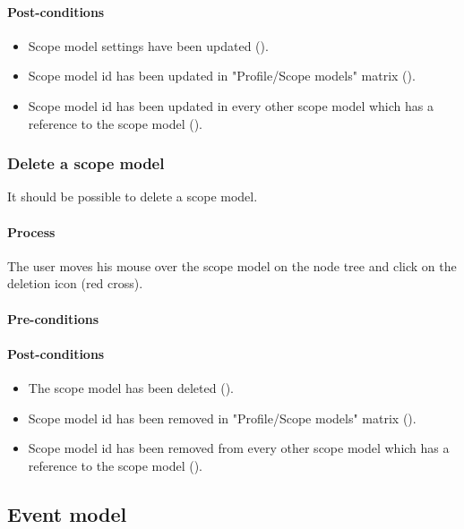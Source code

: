 \documentclass[11pt,a4paper,oneside]{article}
\begin{document}
\paragraph{Post-conditions}
\begin{itemize}
	\item Scope model settings have been updated ().
	\item Scope model id has been updated in "Profile/Scope models" matrix ().
	\item Scope model id has been updated in every other scope model which has a reference to the scope model ().
\end{itemize}

\subsubsection{Delete a scope model}
It should be possible to delete a scope model.

\paragraph{Process}
The user moves his mouse over the scope model on the node tree and click on the deletion icon (red cross).

\paragraph{Pre-conditions}

\paragraph{Post-conditions}
\begin{itemize}
	\item The scope model has been deleted ().
	\item Scope model id has been removed in "Profile/Scope models" matrix ().
	\item Scope model id has been removed from every other scope model which has a reference to the scope model ().
\end{itemize}

\subsection{Event model}
\end{document}
